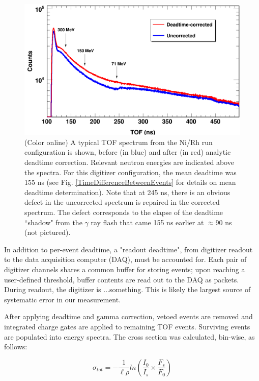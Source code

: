 \documentclass[twocolumn,secnumarabic,amssymb, nobibnotes, aps, prl,
superscriptaddress, nobalancelastpage]{revtex4}
\newcommand{\tot}{\ensuremath{\sigma_{tot}}}
\begin{document}
\begin{figure}
    \includegraphics[scale=0.3]{figures/CorrectionEffectOnTOF.png}
    \caption{(Color online) A typical TOF spectrum from the Ni/Rh
        run configuration is shown, before (in blue) and after (in red) analytic
        deadtime correction. Relevant neutron energies are indicated above the spectra.
        For this digitizer configuration, the mean deadtime was 155 ns (see Fig.
        \ref{TimeDifferenceBetweenEvents} for details on mean deadtime determination).
        Note that at 245 ns, there is an
        obvious defect in the uncorrected spectrum is repaired in the corrected
        spectrum. The defect
        corresponds to the elapse of the deadtime ``shadow" from the $\gamma$
        ray flash that came 155 ns earlier at $\approx$90 ns (not pictured).
    }
    \label{CorrectionEffectOnTOF}
\end{figure}

In addition to per-event deadtime, a "readout deadtime", from digitizer readout 
to the data acquisition computer (DAQ), must be accounted for. Each pair of
digitizer channels shares a common buffer for storing events; upon reaching a
user-defined threshold, buffer contents are read out to the DAQ as packets.
During readout, the digitizer is ...something.
This is likely the largest source of systematic error in our measurement.

After applying deadtime and gamma correction, vetoed events are removed and
integrated charge gates are applied to remaining TOF events.
Surviving events are populated into energy spectra. The cross section was
calculated, bin-wise, as follows:

$$
\tot = -\frac{1}{\ell\rho}
ln \left(\frac{I_{0}}{I_{s}}\times\frac{F_{s}}{F_{0}}\right)
$$
\end{document}
